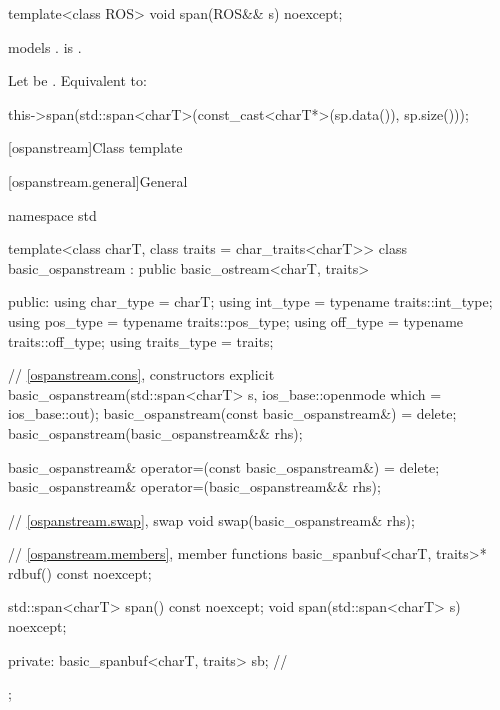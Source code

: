 \begin{itemdecl}
template<class ROS> void span(ROS&& s) noexcept;
\end{itemdecl}

\begin{itemdescr}
\pnum
\constraints
{} models .
is .

\pnum
\effects
Let  be .
Equivalent to:
\begin{codeblock}
this->span(std::span<charT>(const_cast<charT*>(sp.data()), sp.size()));
\end{codeblock}
\end{itemdescr}

[ospanstream]{Class template }

[ospanstream.general]{General}

%
\begin{codeblock}
namespace std {
  template<class charT, class traits = char_traits<charT>>
  class basic_ospanstream
    : public basic_ostream<charT, traits> {
  public:
    using char_type   = charT;
    using int_type    = typename traits::int_type;
    using pos_type    = typename traits::pos_type;
    using off_type    = typename traits::off_type;
    using traits_type = traits;

    // \ref{ospanstream.cons}, constructors
    explicit basic_ospanstream(std::span<charT> s,
                               ios_base::openmode which = ios_base::out);
    basic_ospanstream(const basic_ospanstream&) = delete;
    basic_ospanstream(basic_ospanstream&& rhs);

    basic_ospanstream& operator=(const basic_ospanstream&) = delete;
    basic_ospanstream& operator=(basic_ospanstream&& rhs);

    // \ref{ospanstream.swap}, swap
    void swap(basic_ospanstream& rhs);

    // \ref{ospanstream.members}, member functions
    basic_spanbuf<charT, traits>* rdbuf() const noexcept;

    std::span<charT> span() const noexcept;
    void span(std::span<charT> s) noexcept;

  private:
    basic_spanbuf<charT, traits> sb;    // \expos
  };
}
\end{codeblock}

